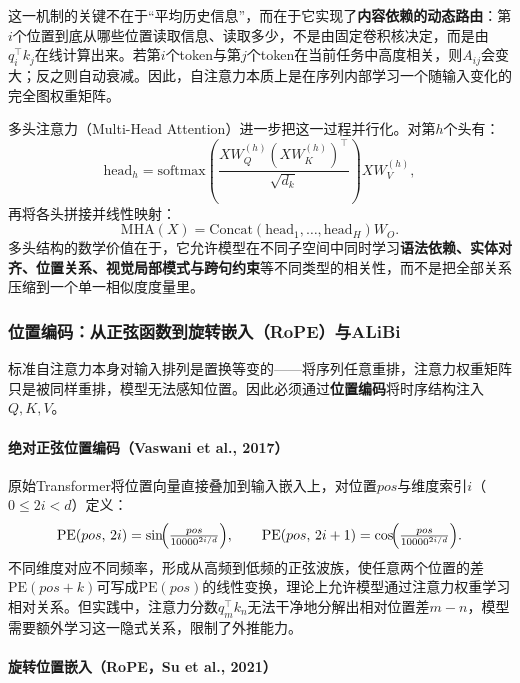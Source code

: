 \documentclass[12pt,a4paper]{article}
\begin{document}
这一机制的关键不在于“平均历史信息”，而在于它实现了\textbf{内容依赖的动态路由}：第$i$个位置到底从哪些位置读取信息、读取多少，不是由固定卷积核决定，而是由$q_i^\top k_j$在线计算出来。若第$i$个token与第$j$个token在当前任务中高度相关，则$A_{ij}$会变大；反之则自动衰减。因此，自注意力本质上是在序列内部学习一个随输入变化的完全图权重矩阵。

多头注意力（Multi-Head Attention）进一步把这一过程并行化。对第$h$个头有：
\begin{equation}
\text{head}_h = \text{softmax}\left(\frac{XW_Q^{(h)} (XW_K^{(h)})^\top}{\sqrt{d_k}}\right)XW_V^{(h)},
\end{equation}
再将各头拼接并线性映射：
\begin{equation}
\text{MHA}(X) = \text{Concat}(\text{head}_1,\ldots,\text{head}_H)W_O.
\end{equation}
多头结构的数学价值在于，它允许模型在不同子空间中同时学习\textbf{语法依赖、实体对齐、位置关系、视觉局部模式与跨句约束}等不同类型的相关性，而不是把全部关系压缩到一个单一相似度度量里。

\subsubsection{位置编码：从正弦函数到旋转嵌入（RoPE）与ALiBi}
\label{sec:positional-encoding}

标准自注意力本身对输入排列是置换等变的——将序列任意重排，注意力权重矩阵只是被同样重排，模型无法感知位置。因此必须通过\textbf{位置编码}将时序结构注入 $Q, K, V$。

\paragraph{绝对正弦位置编码（Vaswani et al., 2017）}

原始Transformer将位置向量直接叠加到输入嵌入上，对位置$pos$与维度索引$i$（$0 \le 2i < d$）定义：
\begin{equation}
\text{PE}(pos,\, 2i)   = \sin\!\Bigl(\tfrac{pos}{10000^{2i/d}}\Bigr),\qquad
\text{PE}(pos,\, 2i+1) = \cos\!\Bigl(\tfrac{pos}{10000^{2i/d}}\Bigr).
\end{equation}
不同维度对应不同频率，形成从高频到低频的正弦波族，使任意两个位置的差$\text{PE}(pos+k)$可写成$\text{PE}(pos)$的线性变换，理论上允许模型通过注意力权重学习相对关系。但实践中，注意力分数$q_m^\top k_n$无法干净地分解出相对位置差$m-n$，模型需要额外学习这一隐式关系，限制了外推能力。

\paragraph{旋转位置嵌入（RoPE，Su et al., 2021）}
\end{document}
